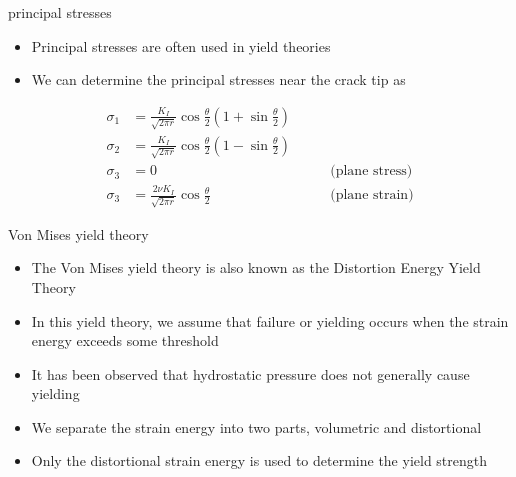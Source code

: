 \documentclass[
  letterpaper,
  ignorenonframetext,
  aspectratio=43,
  handout,
  12pt]{beamer}
\providecommand{\tightlist}{%
  \setlength{\itemsep}{0pt}\setlength{\parskip}{0pt}}
\providecommand{\tightlist}{%
\setlength{\itemsep}{0pt}\setlength{\parskip}{0pt}}
\begin{document}
\begin{frame}{principal stresses}
\protect\hypertarget{principal-stresses}{}
\begin{itemize}
\tightlist
\item
  Principal stresses are often used in yield theories
\item
  We can determine the principal stresses near the crack tip as
\end{itemize}

\[\begin{aligned}
  \label{eq:principal}
  \sigma_1 &= \frac{K_I}{\sqrt{2\pi r}}\cos \frac{\theta}{2}\left(1+\sin \frac{\theta}{2}\right)&\\
  \sigma_2 &= \frac{K_I}{\sqrt{2\pi r}}\cos \frac{\theta}{2}\left(1-\sin \frac{\theta}{2}\right)&\\
  \sigma_3 &= 0 &\qquad \text{(plane stress)}\\
  \sigma_3 &= \frac{2\nu K_I}{\sqrt{2\pi r}}\cos \frac{\theta}{2} &\qquad \text{(plane strain)}
\end{aligned}\]
\end{frame}

\begin{frame}{Von Mises yield theory}
\protect\hypertarget{von-mises-yield-theory}{}
\begin{itemize}
\tightlist
\item
  The Von Mises yield theory is also known as the Distortion Energy
  Yield Theory
\item
  In this yield theory, we assume that failure or yielding occurs when
  the strain energy exceeds some threshold
\item
  It has been observed that hydrostatic pressure does not generally
  cause yielding
\item
  We separate the strain energy into two parts, volumetric and
  distortional
\item
  Only the distortional strain energy is used to determine the yield
  strength
\end{itemize}
\end{frame}
\end{document}
